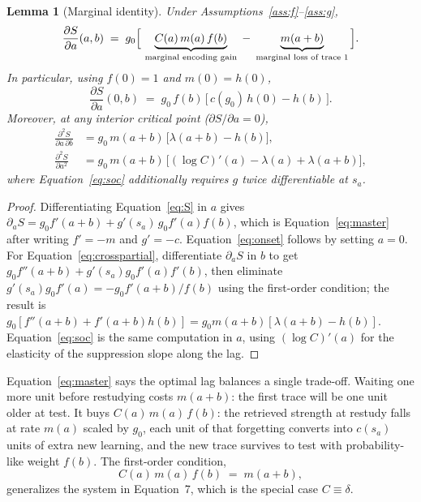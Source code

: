 \documentclass[man, 12pt, floatsintext]{apa6}
\newtheorem{lemma}{Lemma}
\theoremstyle{definition}
\theoremstyle{remark}
\begin{document}
\begin{lemma}[Marginal identity]\label{lem:marginal}
Under Assumptions~\ref{ass:f}--\ref{ass:g},
\begin{equation}\label{eq:master}
  \frac{\partial S}{\partial a}(a,b) \;=\; g_0\Big[\, \underbrace{C(a)\, m(a)\, f(b)}_{\textnormal{marginal encoding gain}} \;-\; \underbrace{m(a+b)}_{\textnormal{marginal loss of trace 1}} \Big].
\end{equation}
In particular, using $f(0)=1$ and $m(0)=h(0)$,
\begin{equation}\label{eq:onset}
  \frac{\partial S}{\partial a}(0,b) \;=\; g_0\, f(b)\,\big[\, c(g_0)\, h(0) - h(b) \,\big].
\end{equation}
Moreover, at any interior critical point ($\partial S/\partial a = 0$),
\begin{align}
  \frac{\partial^2 S}{\partial a\, \partial b} &= g_0\, m(a+b)\,\big[\lambda(a+b) - h(b)\big], \label{eq:crosspartial}\\
  \frac{\partial^2 S}{\partial a^2} &= g_0\, m(a+b)\,\big[(\log C)'(a) - \lambda(a) + \lambda(a+b)\big], \label{eq:soc}
\end{align}
where Equation~\ref{eq:soc} additionally requires $g$ twice differentiable at $s_a$.
\end{lemma}

\begin{proof}
Differentiating Equation~\ref{eq:S} in $a$ gives $\partial_a S = g_0 f'(a+b) + g'(s_a)\, g_0 f'(a) f(b)$, which is Equation~\ref{eq:master} after writing $f' = -m$ and $g' = -c$. Equation~\ref{eq:onset} follows by setting $a=0$. For Equation~\ref{eq:crosspartial}, differentiate $\partial_a S$ in $b$ to get $g_0 f''(a+b) + g'(s_a) g_0 f'(a) f'(b)$, then eliminate $g'(s_a) g_0 f'(a) = -g_0 f'(a+b)/f(b)$ using the first-order condition; the result is $g_0[f''(a+b) + f'(a+b) h(b)] = g_0 m(a+b)[\lambda(a+b) - h(b)]$. Equation~\ref{eq:soc} is the same computation in $a$, using $(\log C)'(a)$ for the elasticity of the suppression slope along the lag.
\end{proof}

Equation~\ref{eq:master} says the optimal lag balances a single trade-off. Waiting one more unit before restudying costs $m(a+b)$: the first trace will be one unit older at test. It buys $C(a)\, m(a)\, f(b)$: the retrieved strength at restudy falls at rate $m(a)$ scaled by $g_0$, each unit of that forgetting converts into $c(s_a)$ units of extra new learning, and the new trace survives to test with probability-like weight $f(b)$. The first-order condition,
\begin{equation}\label{eq:foc}
  C(a)\, m(a)\, f(b) \;=\; m(a+b),
\end{equation}
generalizes the system in Equation~7, which is the special case $C \equiv \delta$.
\end{document}
